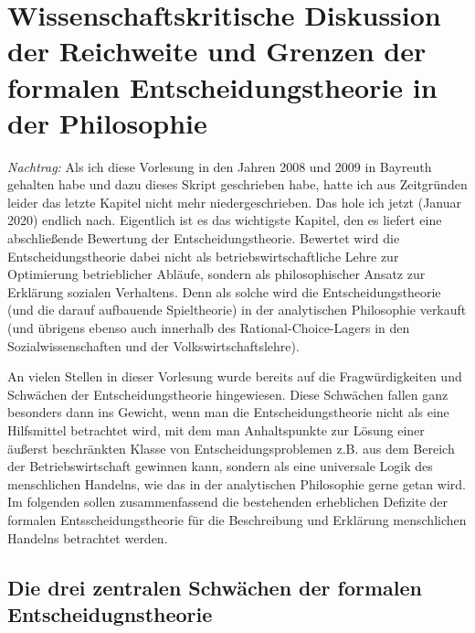 \section{Wissenschaftskritische Diskussion der Reichweite und Grenzen der formalen Entscheidungstheorie in der Philosophie}

{\em Nachtrag:} Als ich diese Vorlesung in den Jahren 2008 und 2009 in Bayreuth
gehalten habe und dazu dieses Skript geschrieben habe, hatte ich aus Zeitgründen
leider das letzte Kapitel nicht mehr niedergeschrieben. Das hole ich jetzt
(Januar 2020) endlich nach. Eigentlich ist es das wichtigste Kapitel, den es
liefert eine abschließende Bewertung der Entscheidungstheorie. Bewertet wird die
Entscheidungstheorie dabei nicht als betriebswirtschaftliche Lehre zur
Optimierung betrieblicher Abläufe, sondern als philosophischer Ansatz zur
Erklärung sozialen Verhaltens. Denn als solche wird die Entscheidungstheorie
(und die darauf aufbauende Spieltheorie) in der analytischen Philosophie
verkauft (und übrigens ebenso auch innerhalb des Rational-Choice-Lagers in den
Sozialwissenschaften und der Volkswirtschaftslehre). 


An vielen Stellen in dieser Vorlesung wurde
bereits auf die Fragwürdigkeiten und Schwächen der Entscheidungstheorie
hingewiesen. Diese Schwächen fallen ganz besonders dann ins Gewicht, wenn man
die Entscheidungstheorie nicht als eine Hilfsmittel betrachtet wird, mit dem man
Anhaltspunkte zur Lösung einer äußerst beschränkten Klasse von
Entscheidungsproblemen z.B. aus dem Bereich der Betriebswirtschaft gewinnen
kann, sondern als eine universale Logik des menschlichen Handelns, wie das in
der analytischen Philosophie gerne getan wird. Im folgenden sollen
zusammenfassend die bestehenden erheblichen Defizite der formalen
Entsscheidungstheorie für die Beschreibung und Erklärung menschlichen Handelns
betrachtet werden.



\subsection{Die drei zentralen Schwächen der formalen Entscheidugnstheorie}

